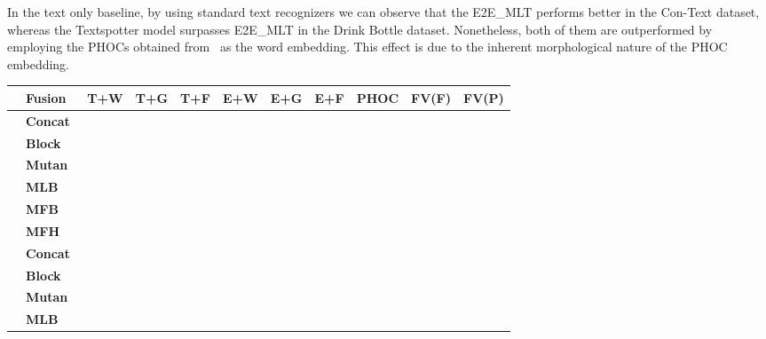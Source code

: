 \documentclass[10pt,twocolumn,letterpaper]{article}
\begin{document}
In the text only baseline, by using standard text recognizers we can observe that the E2E\_MLT performs better in the Con-Text dataset, whereas the Textspotter model surpasses E2E\_MLT in the Drink Bottle dataset. Nonetheless, both of them are outperformed by employing the PHOCs obtained from~\cite{Gomez_2018_ECCV} as the word embedding. This effect is due to the inherent morphological nature of the PHOC embedding.
\setlength\tabcolsep{7pt}
\begin{table*}[!tp]
\small
\normalsize
\begin{center}
\begin{tabular}{c|l|l|l|l|l|l|l|l|l|l}
\multicolumn{1}{l|}{} & \textbf{Fusion} & \textbf{T+W} & \textbf{T+G} & \textbf{T+F} & \textbf{E+W} & \textbf{E+G} & \textbf{E+F} & \textbf{PHOC} & \textbf{FV(F)} & \textbf{FV(P)} \\ \hline
 \parbox[t]{4mm}{} & \textbf{Concat} &         &         &         &         &        &         &          &           & \boldmath \\
&\textbf{Block~\cite{ben2019block}}  &         &         &         &         &         &         &          &           &           \\
&\textbf{Mutan~\cite{ben2017mutan}}    &         &         &         &         &         &         &          &           &          \\
&\textbf{MLB~\cite{kim2016hadamard}}    &         &         &         &         &         &         &          &           &           \\
&\textbf{MFB~\cite{yu2017multi}}    &         &         &         &         &         &         &          &           &           \\
&\textbf{MFH~\cite{yu2018beyond}}    &         &         &         &         &         &         &          &           & \\
\hline
 \parbox[t]{4mm}{} & \textbf{Concat} &         &        &         &         &         &          &          &           & \boldmath \\
&\textbf{Block~\cite{ben2019block}}  &         &         &        &        &         &         &          &           &           \\
&\textbf{Mutan~\cite{ben2017mutan}}    &         &         &         &         &         &         &          &           &           \\
&\textbf{MLB~\cite{kim2016hadamard}}    &         &         &         &         &         &         &          &           &           \\

\end{tabular}
\end{center}
\end{table*}
\end{document}
